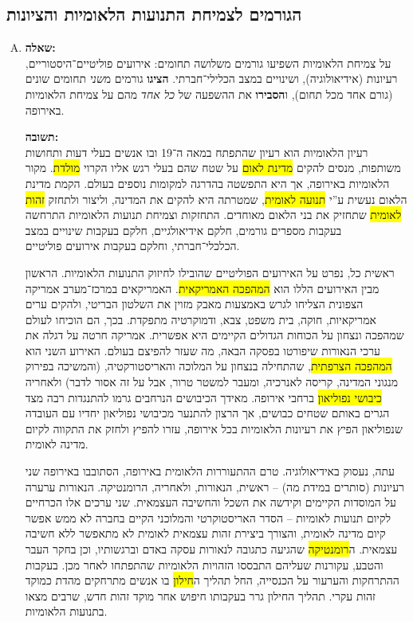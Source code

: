 \documentclass[a4paper]{article}
\newcommand\hl[1]   {\colorbox{yellow}{\!\!#1\!\!}}
\begin{document}
	\subsection{הגורמים לצמיחת התנועות הלאומיות והציונות}
		\begin{enumerate}[A.]
			\item \textbf{שאלה: }\\
			על צמיחת הלאומיות השפיעו גורמים משלושה תחומים: אירועים פוליטיים־היסטוריים, רעיונות (אידיאולוגיה), ושינויים במצב הכלילי־חברתי. \textbf{הציגו} גורמים מ\textit{שני} תחומים שונים (גורם אחד מכל תחום), ו\textbf{הסבירו} את ההשפעה של \textit{כל אחד} מהם על צמיחת הלאומיות באירופה. 
			
			\textbf{תשובה: }\\
			רעיון הלאומיות הוא רעיון שהתפתח במאה ה־19 ובו אנשים בעלי דעות ותחושות משותפות, מנסים להקים \hl{מדינת לאום} על שטח שהם בעלי רגש אליו הקרוי \hl{מולדת}. מקור הלאומיות באירופה, אך היא התפשטה בהדרגה למקומות נוספים בעולם. הקמת מדינת הלאום נעשית ע''י \hl{תנועה לאומית}, שמטרתה היא להקים את המדינה, וליצור ולתחזק \hl{זהות לאומית} שתחזיק את בני הלאום מאוחדים. התחזקות וצמיחת תנועות הלאומיות התרחשה בעקבות מספרים גורמים, חלקם אידיאולגיים, חלקם בעקבות שינויים במצב הכלכלי־חברתי, וחלקם בעקבות אירועים פוליטיים. 
			
			ראשית כל, נפרט על האירועים הפוליטיים שהובילו לחיזוק התנועות הלאומיות. הראשון מבין האירועים הללו הוא \hl{המהפכה האמריקאית}. האמריקאים במרכז־מערב אמריקה הצפונית הצליחו לגרש באמצעות מאבק מזוין את השלטון הבריטי, ולהקים ערים אמריקאיות, חוקה, בית משפט, צבא, ודמוקרטיה מתפקדת. בכך, הם הוכיחו לעולם שמהפכה ונצחון על הכוחות הגדולים הקיימים היא אפשרית. אמריקה חרטה על דגלה את ערכי הנאורות שיפורטו בפסקה הבאה, מה שעזר להפיצם בעולם. האירוע השני הוא \hl{המהפכה הצרפתית}, שהתחילה בנצחון על המלוכה והאריסטורקטיה, (והמשיכה בפירוק מנגוני המדינה, קריסה לאנרכיה, ומעבר למשטר טרור, אבל על זה אסור לדבר) ולאחריה \hl{כיבושי נפוליאון} ברחבי אירופה. מאידך הכיבושים הנרחבים גרמו להתנגדות רבה מצד הגרים באותם שטחים כבושים, אך הרצון להתנער מכיבושי נפוליאון יחדיו עם העובדה שנפוליאון הפיץ את רעיונות הלאומיות בכל אירופה, עזרו להפיץ ולחזק את התקווה לקיום מדינה לאומית. 
			
			עתה, נעסוק באידיאולוגיה. טרם ההתעוררות הלאומית באירופה, הסתובבו באירופה שני רעיונות (סותרים במידת מה) – ראשית, הנאורות, ולאחריה, הרומנטיקה. הנאורות ערערה על המוסדות הקיימים וקידשה את השכל והחשיבה העצמאית. שני ערכים אלו הכרחיים לקיום תנועות לאומיות – הסדר האריסטוקרטי והמלוכני הקיים בחברה לא ממש אפשר קיום מדינה לאומית, והצורך ביצירת זהות עצמאית לאומית לא מתאפשר ללא חשיבה עצמאית. ה\hl{רומנטיקה} שהגיעה כתגובה לנאורות עסקה באדם וברגשותיו, וכן בחקר העבר והטבע, עקורנות שעליהם התבססו הזהויות הלאומיות שהתפתחו לאחר מכן. בעקבות ההתרחקות והערעור על הכנסייה, החל תהליך ה\hl{חילון} בו אנשים מתרחקים מהדת כמוקד זהות עקרי. תהליך החילון גרר בעקבותו חיפוש אחר מוקד זהות חדש, שרבים מצאו בתנועות הלאומיות. 
			

\end{enumerate}
\end{document}
